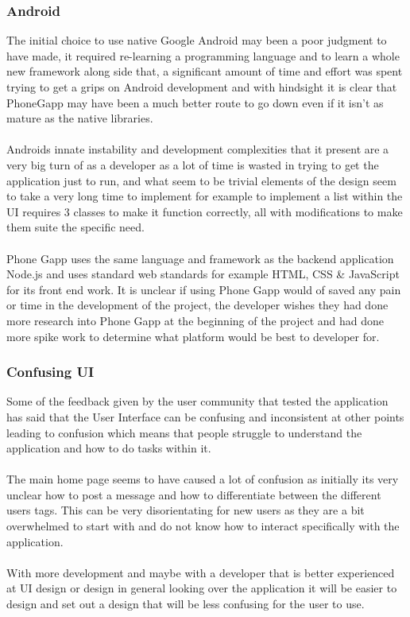 \subsubsection{Android}

The initial choice to use native Google Android may been a poor judgment to have made, it required re-learning a programming language and to learn a whole new framework along side that, a significant amount of time and effort was spent trying to get a grips on Android development and with hindsight it is clear that PhoneGapp may have been a much better route to go down even if it isn't as mature as the native libraries.\\
\\
Androids innate instability and development complexities that it present are a very big turn of as a developer as a lot of time is wasted in trying to get the application just to run, and what seem to be trivial elements of the design seem to take a very long time to implement for example to implement a list within the UI requires 3 classes to make it function correctly, all with modifications to make them suite the specific need.\\
\\
Phone Gapp uses the same language and framework as the backend application Node.js and uses standard web standards for example HTML, CSS \& JavaScript for its front end work. It is unclear if using Phone Gapp would of saved any pain or time in the development of the project, the developer wishes they had done more research into Phone Gapp at the beginning of the project and had done more spike work to determine what platform would be best to developer for.

\subsubsection{Confusing UI}

Some of the feedback given by the user community that tested the application has said that the User Interface can be confusing and inconsistent at other points leading to confusion which means that people struggle to understand the application and how to do tasks within it.\\
\\
The main home page seems to have caused a lot of confusion as initially its very unclear how to post a message and how to differentiate between the different users tags. This can be very disorientating for new users as they are a bit overwhelmed to start with and do not know how to interact specifically with the application.\\
\\
With more development and maybe with a developer that is better experienced at UI design or design in general looking over the application it will be easier to design and set out a design that will be less confusing for the user to use.

